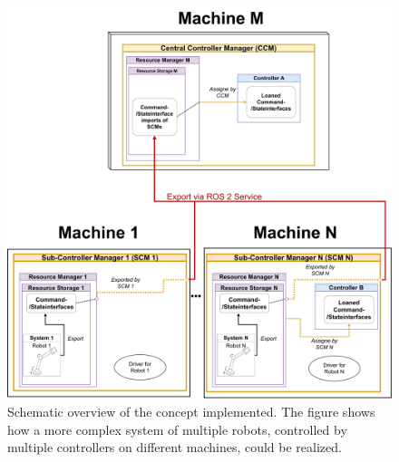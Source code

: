 \begin{figure}[htbp]
	\centering
	\includegraphics[width=1\textwidth]{Figures/C4/distributed_control_with_driver.pdf}
	\caption{Schematic overview of the concept implemented. The figure shows how a more complex system of multiple robots, controlled by multiple controllers on different machines, could be realized. }
	\label{c4_fig_concept_overview}
\end{figure}
